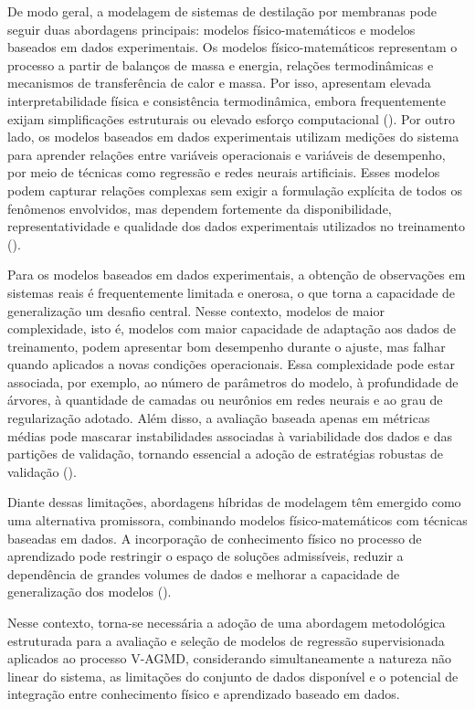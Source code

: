 De modo geral, a modelagem de sistemas de destilação por membranas pode seguir duas abordagens principais: modelos físico-matemáticos e modelos baseados em dados experimentais. Os modelos físico-matemáticos representam o processo a partir de balanços de massa e energia, relações termodinâmicas e mecanismos de transferência de calor e massa. Por isso, apresentam elevada interpretabilidade física e consistência termodinâmica, embora frequentemente exijam simplificações estruturais ou elevado esforço computacional (\cite{Hitsov2015,Olatunji2018}). Por outro lado, os modelos baseados em dados experimentais utilizam medições do sistema para aprender relações entre variáveis operacionais e variáveis de desempenho, por meio de técnicas como regressão e redes neurais artificiais. Esses modelos podem capturar relações complexas sem exigir a formulação explícita de todos os fenômenos envolvidos, mas dependem fortemente da disponibilidade, representatividade e qualidade dos dados experimentais utilizados no treinamento (\cite{Zhu2022}).

Para os modelos baseados em dados experimentais, a obtenção de observações em sistemas reais é frequentemente limitada e onerosa, o que torna a capacidade de generalização um desafio central. Nesse contexto, modelos de maior complexidade, isto é, modelos com maior capacidade de adaptação aos dados de treinamento, podem apresentar bom desempenho durante o ajuste, mas falhar quando aplicados a novas condições operacionais. Essa complexidade pode estar associada, por exemplo, ao número de parâmetros do modelo, à profundidade de árvores, à quantidade de camadas ou neurônios em redes neurais e ao grau de regularização adotado. Além disso, a avaliação baseada apenas em métricas médias pode mascarar instabilidades associadas à variabilidade dos dados e das partições de validação, tornando essencial a adoção de estratégias robustas de validação (\cite{Vabalas2019,Yip2019,Roberts2017,Kirk2024}).

Diante dessas limitações, abordagens híbridas de modelagem têm emergido como uma alternativa promissora, combinando modelos físico-matemáticos com técnicas baseadas em dados. A incorporação de conhecimento físico no processo de aprendizado pode restringir o espaço de soluções admissíveis, reduzir a dependência de grandes volumes de dados e melhorar a capacidade de generalização dos modelos (\cite{Xu2022,Muther2022,Kasilingam2024}).

Nesse contexto, torna-se necessária a adoção de uma abordagem metodológica estruturada para a avaliação e seleção de modelos de regressão supervisionada aplicados ao processo V-AGMD, considerando simultaneamente a natureza não linear do sistema, as limitações do conjunto de dados disponível e o potencial de integração entre conhecimento físico e aprendizado baseado em dados.

